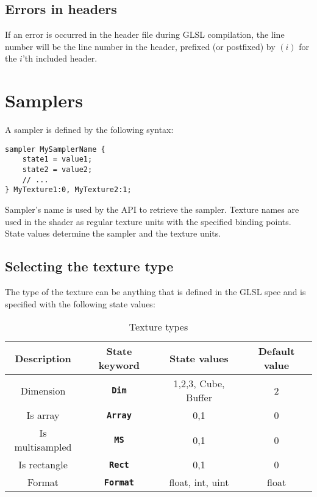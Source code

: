 \documentclass[11pt,a4paper,final,titlepage]{article}
\begin{document}
\subsection{Errors in headers}
If an error is occurred in the header file during GLSL compilation, the line number
will be the line number in the header, prefixed (or postfixed) by $(i)$ for the $i$'th
included header.

\pagebreak
\section{Samplers}\label{sec:samplers}

A sampler is defined by the following syntax:
\begin{lstlisting}
sampler MySamplerName {
	state1 = value1;
	state2 = value2;
	// ...
} MyTexture1:0, MyTexture2:1;
\end{lstlisting}
Sampler's name is used by the API to retrieve the sampler. Texture names are used in the shader
as regular texture units with the specified binding points.
State values determine the sampler and the texture units.

\subsection{Selecting the texture type}
The type of the texture can be anything that is defined in the GLSL spec and is specified with
the following state values:
\begin{table}[h]
\centering
\begin{tabular}{|c|c|c|c|}
\hline
Description & State keyword & State values & Default value\\
\hline\hline
Dimension & \texttt{\textbf{Dim}} & 1,2,3, Cube, Buffer & 2\\
\hline
Is array & \texttt{\textbf{Array}} & 0,1 & 0\\
\hline
Is multisampled & \texttt{\textbf{MS}} & 0,1 & 0\\
\hline
Is rectangle & \texttt{\textbf{Rect}} & 0,1 & 0\\
\hline
Format & \texttt{\textbf{Format}} & float, int, uint & float\\
\hline
\end{tabular}
\caption{Texture types}
\label{tab:texTypes}
\end{table}
\end{document}
